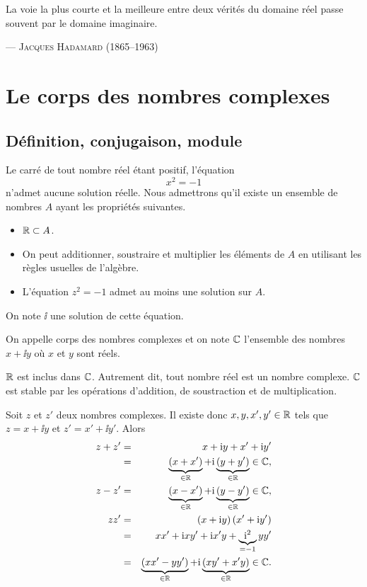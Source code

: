 \documentclass{magnoliaold}
\begin{document}
\setlength{}
\epigraph{\og La voie la plus courte et la meilleure entre deux vérités du domaine réel passe souvent par le domaine imaginaire. \fg}{--- \textsc{Jacques Hadamard (1865--1963)}}

\magtoc

\section{Le corps des nombres complexes}
\subsection{Définition, conjugaison, module}
Le carré de tout nombre réel étant positif, l'équation
$$x^2=-1$$
n'admet aucune solution réelle. Nous admettrons qu'il existe un ensemble de
nombres $A$ ayant les propriétés suivantes.
\begin{itemize}
  \item $\mathbb{R}\subset A$.
  \item On peut additionner, soustraire et multiplier les éléments de $A$ en
    utilisant les règles usuelles de l'algèbre.
  \item L'équation $z^2=-1$ admet au moins une solution sur $A$.
\end{itemize}
On note $\ii$ une solution de cette équation.

\begin{definition}[utile=-3]
  On appelle corps des nombres complexes et on note $\mathbb{C}$
  l'ensemble des nombres $x+\ii y$ où $x$ et $y$ sont réels.
\end{definition}

\begin{remarques}
\remarque $\mathbb{R}$ est inclus dans $\mathbb{C}$. Autrement dit, tout nombre réel est un nombre
  complexe.
\remarque $\mathbb{C}$ est stable par les opérations d'addition, de soustraction et
  de multiplication.
\begin{preuve}
Soit $z$ et $z'$ deux nombres complexes. Il existe donc
$x,y,x',y'\in\mathbb{R}$ tels que $z=x+\ii y$ et $z'=x'+\ii y'$. Alors
\begin{eqnarray*}
z+z' &=& x+{\rm i} y+x'+{\rm i} y'\\
     &=& \underbrace{\left(x+x'\right)}_{\in\mathbb{R}}
         +{\rm i} \underbrace{\left(y+y'\right)}_{\in\mathbb{R}}\in\mathbb{C},\\
z-z' &=& \underbrace{\left(x-x'\right)}_{\in\mathbb{R}}
         +{\rm i} \underbrace{\left(y-y'\right)}_{\in\mathbb{R}}\in\mathbb{C},\\
z z' &=& \left(x+{\rm i} y\right)\left(x'+{\rm i} y'\right)\\
     &=& x x'+{\rm i} x y'+{\rm i} x' y+\underbrace{{\rm i}^2}_{=-1} y y'\\
     &=& \underbrace{\left(x x'-y y'\right)}_{\in\mathbb{R}} +
         {\rm i}\underbrace{\left(x y'+x' y\right)}_{\in\mathbb{R}} \in\mathbb{C}.
\end{eqnarray*}
\end{preuve}
\end{remarques}
\end{document}
